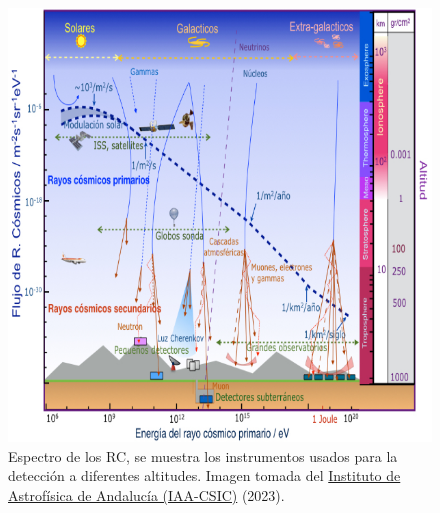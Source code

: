 \begin{frame}{}
\begin{columns}
            \begin{column}{0.5\textwidth} %
                \begin{figure}
                    \centering
                    \includegraphics[width=1.0\textwidth]{Figures/spectrum2.png}
                    \caption{\tiny Espectro de los RC, se muestra los instrumentos usados para la detección a diferentes altitudes. Imagen tomada del \href{https://revista.iaa.csic.es/content/portada/404/69}{Instituto de Astrofísica de Andalucía (IAA-CSIC)} (2023).}                    
                \end{figure}
            \end{column}
        \end{columns}
    \end{frame}

        
